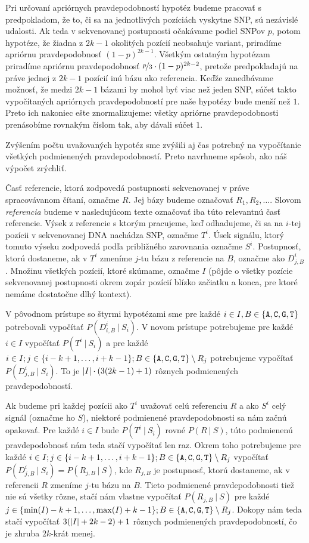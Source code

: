 Pri určovaní apriórnych pravdepodobností hypotéz budeme pracovať s predpokladom, že to, či sa na 
jednotlivých
pozíciách vyskytne SNP, sú nezávislé udalosti.
Ak teda v sekvenovanej postupnosti očakávame podiel SNPov $p$, potom hypotéze, že žiadna z $2k-1$ okolitých 
pozícií neobsahuje variant, priradíme apriórnu pravdepodobnosť $(1-p)^{2k-1}$. Všetkým ostatným 
hypotézam 
priradíme apriórnu pravdepodobnosť $\nicefrac{p}{3} \cdot (1-p)^{2k-2}$, pretože predpokladajú na
práve jednej z $2k-1$ pozícií inú bázu ako referencia. Keďže zanedbávame možnosť, že medzi $2k-1$
bázami by mohol byť viac než jeden SNP, súčet takto vypočítaných apriórnych pravdepodobností pre
naše hypotézy bude menší než $1$. Preto ich nakoniec ešte znormalizujeme: všetky apriórne 
pravdepodobnosti prenásobíme rovnakým číslom tak, aby dávali súčet $1$.


Zvýšením počtu uvažovaných hypotéz sme zvýšili aj čas potrebný na vypočítanie všetkých
podmienených pravdepodobností. Preto navrhneme spôsob, ako náš výpočet zrýchliť.

Časť referencie, ktorá zodpovedá postupnosti sekvenovanej v práve spracovávanom čítaní, označme
$R$. Jej bázy budeme označovať $R_1, R_2, \dots$. Slovom \emph{referencia} budeme v nasledujúcom
texte označovať iba túto relevantnú časť referencie.
Výsek z referencie s ktorým pracujeme, keď odhadujeme, či sa na $i$-tej pozícii v sekvenovanej
DNA nachádza SNP, označme $T^i$. Úsek signálu, ktorý tomuto výseku zodpovedá podľa približného
zarovnania označme $S^i$. Postupnosť, ktorú dostaneme, ak v $T^i$ zmeníme $j$-tu bázu z referencie
na $B$, označme ako $D_{j,B}^i$. Množinu všetkých pozícií, ktoré skúmame, označme $I$ (pôjde o všetky
pozície sekvenovanej postupnosti okrem zopár pozícií blízko začiatku a konca, pre ktoré nemáme
dostatočne dlhý kontext).

V pôvodnom prístupe so štyrmi hypotézami sme pre každé $i \in I, B \in \bazy$ potrebovali vypočítať 
$P(D_{i,B}^i ~|~ S_i)$. V novom prístupe potrebujeme pre každé $i \in I$ vypočítať
$P(T^i ~|~ S_i)$ a pre každé $i \in I; j \in \{i-k+1, \dots, i+k-1\}; B \in \bazy \setminus R_j$ 
potrebujeme vypočítať $P(D_{j, B}^i ~|~ S_i)$. To je $\abs*{I} \cdot (3(2k-1)+1)$ rôznych podmienených
pravdepodobností.

Ak budeme pri každej pozícii ako $T^i$ uvažovať celú referenciu $R$ a ako $S^i$ celý signál (označme
ho $S$), niektoré podmienené pravdepodobnosti sa nám začnú opakovať. Pre každé $i \in I$ bude $P(T^i ~|~ S_i)$
rovné $P(R ~|~ S)$, túto podmienenú pravdepodobnosť nám teda stačí vypočítať len raz. Okrem toho
potrebujeme pre každé $i \in I; j \in \{i-k+1, \dots, i+k-1\}; B \in \bazy \setminus R_j$ vypočítať
$P(D_{j, B}^i ~|~ S_i) = P(R_{j, B} ~|~ S)$, kde $R_{j, B}$ je postupnosť, ktorú dostaneme, ak v
referencii $R$ zmeníme $j$-tu bázu na $B$. Tieto podmienené pravdepodobnosti tiež nie sú všetky rôzne,
stačí nám vlastne vypočítať $P(R_{j, B} ~|~ S)$ pre každé $j \in \{\min(I)-k+1, \dots, \max(I)+k-1\}; B 
\in \bazy \setminus R_j$. Dokopy nám teda stačí vypočítať $3(\abs*{I} + 2k -2) + 1$ rôznych podmienených 
pravdepodobností, čo je zhruba $2k$-krát menej.


